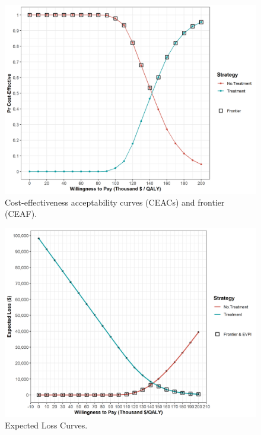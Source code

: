 \documentclass[]{book}
\begin{document}
\begin{figure}

{\centering \includegraphics[width=1\linewidth]{../figs/05a_ceac_ceaf} 

}

\caption{Cost-effectiveness acceptability curves (CEACs) and frontier (CEAF).}\label{fig:05a-ceac-ceaf}
\end{figure}

\begin{figure}

{\centering \includegraphics[width=1\linewidth]{../figs/05a_elc} 

}

\caption{Expected Loss Curves.}\label{fig:05a-elc}
\end{figure}
\end{document}

